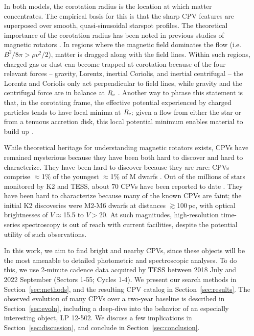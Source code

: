 \documentclass[11pt,twocolumn,tighten]{aastex63}
\begin{document}
In both models, the corotation radius is the location at which matter
concentrates.  The empirical basis for this is that the sharp CPV
features are superposed over smooth, quasi-sinusoidal starspot
profiles.  The theoretical importance of the corotation radius has
been noted in previous studies of magnetic rotators
\citep[e.g.][]{1973ApJ...184..271L,1985Ap&SS.116..285N,1991ApJ...370L..39K,2005ApJ...634.1214L}.
In regions where the magnetic field dominates the flow (i.e.~$B^2/8\pi
> \rho v^2 /2$), matter is dragged along with the field lines.  Within
such regions, charged gas or dust can become trapped at corotation
because of the four relevant forces -- gravity, Lorentz, inertial
Coriolis, and inertial centrifugal -- the Lorentz and Coriolis only
act perpendicular to field lines, while gravity and the centrifugal
force are in balance at $R_{\rm c}$ \citep[e.g.][their
Section~2]{2005MNRAS.357..251T}.  Another way to phrase this statement
is that, in the corotating frame, the effective potential experienced
by charged particles tends to have local minima at $R_{\rm c}$; given
a flow from either the star or from a tenuous accretion disk, this
local potential minimum enables material to build up
\citep{2005MNRAS.357..251T}.

While theoretical heritage for understanding magnetic rotators exists,
CPVs have remained mysterious because they have been both hard to
discover and hard to characterize.   They have been hard to discover
because they are rare: CPVs comprise $\approx$1\% of the youngest
$\approx$1\% of M dwarfs \citep{2018AJ....155..196R}.  Out of the
millions of stars monitored by K2 and TESS, about 70 CPVs have been
reported to date
\citep{2016AJ....152..114R,2017AJ....153..152S,2018AJ....155...63S,2019ApJ...876..127Z,2020AJ....160...86B,2021AJ....161...60S,2022AJ....163..144G,2023ApJ...945..114P}.
They have been hard to characterize because many of the known CPVs are
faint; the initial K2 discoveries
\citep{2016AJ....152..114R,2017AJ....153..152S} were M2-M6 dwarfs at
distances $\gtrsim$100\,pc, with optical brightnesses of
$V$$\approx$15.5 to $V$$>$20.  At such magnitudes, high-resolution
time-series spectroscopy is out of reach with current facilities,
despite the potential utility of such observations.

In this work, we aim to find bright and nearby CPVs, since these
objects will be the most amenable to detailed photometric and
spectroscopic analyses.  To do this, we use 2-minute cadence data
acquired by TESS between 2018 July and 2022 September (Sectors 1-55;
Cycles 1-4).  We present our search methods in
Section~\ref{sec:methods}, and the resulting CPV catalog in
Section~\ref{sec:results}.  The observed evolution of many CPVs over a
two-year baseline is described in Section~\ref{sec:evoln}, including a
deep-dive into the behavior of an especially interesting object, LP
12-502.  We discuss a few implications in
Section~\ref{sec:discussion}, and conclude in
Section~\ref{sec:conclusion}.
\end{document}
